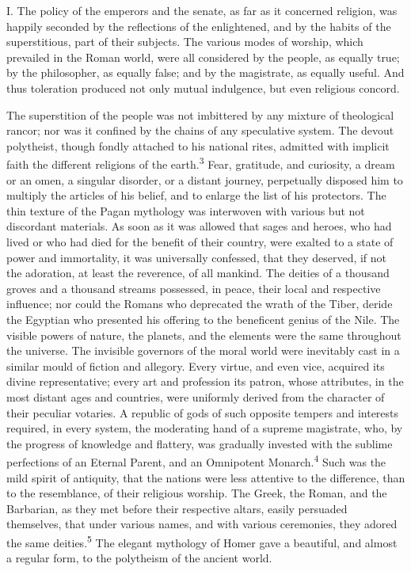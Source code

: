 
I. The policy of the emperors and the senate, as far as it
concerned religion, was happily seconded by the reflections of
the enlightened, and by the habits of the superstitious, part of
their subjects. The various modes of worship, which prevailed in
the Roman world, were all considered by the people, as equally
true; by the philosopher, as equally false; and by the
magistrate, as equally useful. And thus toleration produced not
only mutual indulgence, but even religious concord.

The superstition of the people was not imbittered by any mixture
of theological rancor; nor was it confined by the chains of any
speculative system. The devout polytheist, though fondly attached
to his national rites, admitted with implicit faith the different
religions of the earth.\textsuperscript{3} Fear, gratitude, and curiosity, a dream
or an omen, a singular disorder, or a distant journey,
perpetually disposed him to multiply the articles of his belief,
and to enlarge the list of his protectors. The thin texture of
the Pagan mythology was interwoven with various but not
discordant materials. As soon as it was allowed that sages and
heroes, who had lived or who had died for the benefit of their
country, were exalted to a state of power and immortality, it was
universally confessed, that they deserved, if not the adoration,
at least the reverence, of all mankind. The deities of a thousand
groves and a thousand streams possessed, in peace, their local
and respective influence; nor could the Romans who deprecated the
wrath of the Tiber, deride the Egyptian who presented his
offering to the beneficent genius of the Nile. The visible powers
of nature, the planets, and the elements were the same throughout
the universe. The invisible governors of the moral world were
inevitably cast in a similar mould of fiction and allegory. Every
virtue, and even vice, acquired its divine representative; every
art and profession its patron, whose attributes, in the most
distant ages and countries, were uniformly derived from the
character of their peculiar votaries. A republic of gods of such
opposite tempers and interests required, in every system, the
moderating hand of a supreme magistrate, who, by the progress of
knowledge and flattery, was gradually invested with the sublime
perfections of an Eternal Parent, and an Omnipotent Monarch.\textsuperscript{4}
Such was the mild spirit of antiquity, that the nations were less
attentive to the difference, than to the resemblance, of their
religious worship. The Greek, the Roman, and the Barbarian, as
they met before their respective altars, easily persuaded
themselves, that under various names, and with various
ceremonies, they adored the same deities.\textsuperscript{5} The elegant mythology
of Homer gave a beautiful, and almost a regular form, to the
polytheism of the ancient world.

